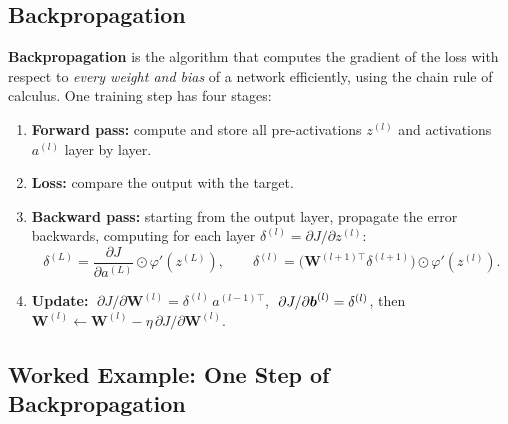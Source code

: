 \subsection{Backpropagation}

\begin{definition}[: Backpropagation]
\textbf{Backpropagation} is the algorithm that computes the gradient of the loss with respect to \emph{every weight and bias} of a network efficiently, using the chain rule of calculus. One training step has four stages:
\begin{enumerate}
  \item \textbf{Forward pass:} compute and store all pre-activations $z^{(l)}$ and activations $a^{(l)}$ layer by layer.
  \item \textbf{Loss:} compare the output with the target.
  \item \textbf{Backward pass:} starting from the output layer, propagate the error backwards, computing for each layer $\delta^{(l)}=\partial J/\partial z^{(l)}$:
  \[
    \delta^{(L)}=\frac{\partial J}{\partial a^{(L)}}\odot\varphi'(z^{(L)}),\qquad
    \delta^{(l)}=\big(\mathbf W^{(l+1)\top}\delta^{(l+1)}\big)\odot\varphi'(z^{(l)}).
  \]
  \item \textbf{Update:} $\;\partial J/\partial\mathbf W^{(l)}=\delta^{(l)}\,a^{(l-1)\top}$, $\;\partial J/\partial\boldsymbol{b}^{(l)}=\delta^{(l)}$, then $\mathbf W^{(l)}\leftarrow\mathbf W^{(l)}-\eta\,\partial J/\partial\mathbf W^{(l)}$.
\end{enumerate}
\end{definition}

\subsection{Worked Example: One Step of Backpropagation}

